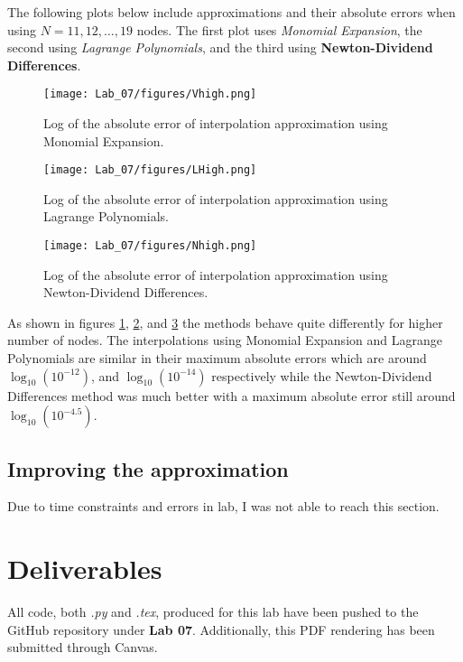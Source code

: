 \documentclass{article}
\begin{document}
\subsubsection{}
The following plots below include approximations and their absolute errors when using \(N=11,12,\dots,19\) nodes. The first plot uses \textit{Monomial Expansion}, the second using \textit{Lagrange Polynomials}, and the third using \textbf{Newton-Dividend Differences}.
\begin{figure}[h!]
    \centering
    \texttt{[image: Lab\_07/figures/Vhigh.png]}
    \caption{Log of the absolute error of interpolation approximation using Monomial Expansion.}
    \label{fig:Vlow}
\end{figure}
\begin{figure}[h!]
    \centering
    \texttt{[image: Lab\_07/figures/LHigh.png]}
    \caption{Log of the absolute error of interpolation approximation using Lagrange Polynomials.}
    \label{fig:Llow}
\end{figure}
\begin{figure}[h!]
    \centering
    \texttt{[image: Lab\_07/figures/Nhigh.png]}
    \caption{Log of the absolute error of interpolation approximation using Newton-Dividend Differences.}
    \label{fig:Nlow}
\end{figure}
As shown in figures \ref{fig:Vlow}, \ref{fig:Llow}, and \ref{fig:Nlow} the methods behave quite differently for higher number of nodes. The interpolations using Monomial Expansion and Lagrange Polynomials are similar in their maximum absolute errors which are around \(\log_{10}(10^{-12})\), and \(\log_{10}(10^{-14})\) respectively while the Newton-Dividend Differences method was much better with a maximum absolute error still around \(\log_{10}(10^{-4.5})\).

\subsection{Improving the approximation}
Due to time constraints and errors in lab, I was not able to reach this section.

\section{Deliverables}
All code, both \textit{.py} and \textit{.tex}, produced for this lab have been pushed to the GitHub repository under \textbf{Lab 07}. Additionally, this PDF rendering has been submitted through Canvas.
\end{document}
